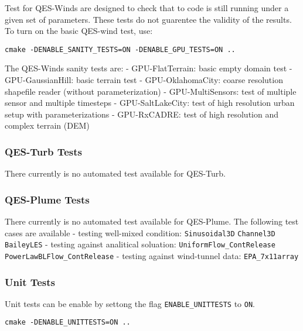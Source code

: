 Test for QES-Winds are designed to check that to code is still running under a given set of parameters. These tests do not guarentee the validity of the results. To turn on the basic QES-wind test, use:
\begin{verbatim}
cmake -DENABLE_SANITY_TESTS=ON -DENABLE_GPU_TESTS=ON ..
\end{verbatim}
The QES-Winds sanity tests are:
- GPU-FlatTerrain: basic empty domain test
- GPU-GaussianHill: basic terrain test
- GPU-OklahomaCity: coarse resolution shapefile reader (without parameterization)
- GPU-MultiSensors: test of multiple sensor and multiple timesteps
- GPU-SaltLakeCity: test of high resolution urban setup with parameterizations
- GPU-RxCADRE: test of high resolution and complex terrain (DEM)

\subsubsection{QES-Turb Tests}

There currently is no automated test available for QES-Turb.

\subsubsection{QES-Plume Tests}

There currently is no automated test available for QES-Plume. The following test cases are available
- testing well-mixed condition: \verb|Sinusoidal3D| \verb|Channel3D| \verb|BaileyLES|
- testing against analitical soluation: \verb|UniformFlow_ContRelease| \verb|PowerLawBLFlow_ContRelease|
- testing against wind-tunnel data: \verb|EPA_7x11array|

\subsubsection{Unit Tests}
Unit tests can be enable by settong the flag \verb|ENABLE_UNITTESTS| to \verb|ON|.
\begin{verbatim}
cmake -DENABLE_UNITTESTS=ON ..
\end{verbatim}
